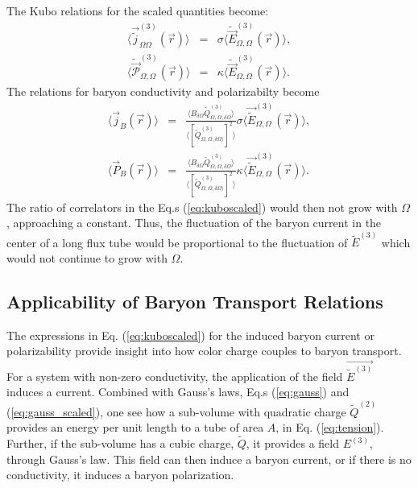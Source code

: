 \documentclass[aps, prc, 12pt, nofootinbib, showpacs, superscriptaddress, tightenlines, groupedaddress]{revtex4-2}
\begin{document}
The Kubo relations for the scaled quantities become:
\begin{eqnarray}
\langle \vec{\tilde{j}}^{(3)}_{\Omega\Omega}(\vec{r})\rangle&=&\sigma \langle\tilde{\vec{E}}^{(3)}_{\Omega,\Omega}(\vec{r})\rangle,\\
\nonumber
\langle\tilde{\vec{\mathcal{P}}}_{\Omega,\Omega}^{(3)}(\vec{r})\rangle&=&\kappa \langle\tilde{\vec{E}}^{(3)}_{\Omega,\Omega}(\vec{r})\rangle.
\end{eqnarray}
The relations for baryon conductivity and polarizabilty become
\begin{eqnarray}\label{eq:kuboscaled}
\langle\vec{j}_B(\vec{r})\rangle&=&\frac{\langle B_{\delta\Omega}\tilde{Q}^{(3)}_{\Omega,\Omega,\delta\Omega}\rangle}
{\langle[\tilde{Q}^{(3)}_{\Omega,\Omega,\delta\Omega\rangle}]^2\rangle}
\sigma\langle\vec{\tilde{E}}^{(3)}_{\Omega,\Omega}(\vec{r})\rangle,\\
\nonumber
\langle\vec{P}_B(\vec{r})\rangle&=&\frac{\langle B_{\delta\Omega}\tilde{Q}^{(3)}_{\Omega,\Omega,\delta\Omega}\rangle}
{\langle[\tilde{Q}^{(3)}_{\Omega,\Omega,\delta\Omega\rangle}]^2\rangle}
\kappa\langle\vec{\tilde{E}}^{(3)}_{\Omega,\Omega}(\vec{r})\rangle.
\end{eqnarray}
The ratio of correlators in the Eq.s (\ref{eq:kuboscaled}) would then not grow with $\Omega$, approaching a constant. Thus, the fluctuation of the baryon current in the center of a long flux tube would be proportional to the fluctuation of $\tilde{E}^{(3)}$ which would not continue to grow with $\Omega$. 

\subsection{Applicability of Baryon Transport Relations}

The expressions in Eq. (\ref{eq:kuboscaled}) for the induced baryon current or polarizability provide insight into how color charge couples to baryon transport. For a system with non-zero conductivity, the application of the field $\vec{\tilde{E}^{{(3)}}}$ induces a current. Combined with Gauss's laws, Eq.s (\ref{eq:gauss}) and (\ref{eq:gauss_scaled}), one see how a sub-volume with quadratic charge $\tilde{Q}^{(2)}$ provides an energy per unit length to a tube of area $A$, in Eq. (\ref{eq:tension}). Further, if the sub-volume has a cubic charge, $\tilde{Q}$, it provides a field $E^{(3)}$, through Gauss's law. This field can then induce a baryon current, or if there is no conductivity, it induces a baryon polarization. 
\end{document}

